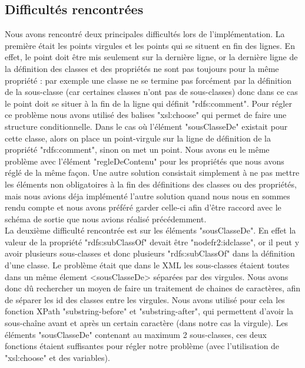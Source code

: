 \documentclass{article}
\begin{document}
\subsection{Difficultés rencontrées}

Nous avons rencontré deux principales difficultés lors de l'implémentation. La première était les points virgules et les points qui se situent en fin des lignes. En effet, le point doit être mis seulement sur la dernière ligne, or la dernière ligne de la définition des classes et des propriétés ne sont pas toujours pour la même propriété : par exemple une classe ne se termine pas forcément par la définition de la sous-classe (car certaines classes n'ont pas de sous-classes) donc dans ce cas le point doit se situer à la fin de la ligne qui définit "rdfs:comment". Pour régler ce problème nous avons utilisé des balises "xsl:choose" qui permet de faire une structure conditionnelle. Dans le cas où l'élément "sousClasseDe" existait pour cette classe, alors on place un point-virgule sur la ligne de définition de la propriété "rdfs:comment", sinon on met un point. Nous avons eu le même problème avec l'élément "regleDeContenu" pour les propriétés que nous avons réglé de la même façon. Une autre solution consistait simplement à ne pas mettre les éléments non obligatoires à la fin des définitions des classes ou des propriétés, mais nous avions déja implémenté l'autre solution quand nous nous en sommes rendu compte et nous avons préféré garder celle-ci afin d'être raccord avec le schéma de sortie que nous avions réalisé précédemment. \\

La deuxième difficulté rencontrée est sur les éléments "sousClasseDe". En effet la valeur de la propriété "rdfs:subClassOf" devait être "nodefr2:idclasse", or il peut y avoir plusieurs sous-classes et donc plusieurs "rdfs:subClassOf" dans la définition d'une classe. Le problème était que dans le XML les sous-classes étaient toutes dans un même élement <sousClasseDe> séparées par des virgules. Nous avons donc dû rechercher un moyen de faire un traitement de chaines de caractères, afin de séparer les id des classes entre les virgules. Nous avons utilisé pour cela les fonction XPath "substring-before" et "substring-after", qui permettent d'avoir la sous-chaîne avant et après un certain caractère (dans notre cas la virgule). Les éléments "sousClasseDe" contenant au maximum 2 sous-classes, ces deux fonctions étaient suffisantes pour régler notre problème (avec l'utilisation de "xsl:choose" et des variables).\\
\end{document}
